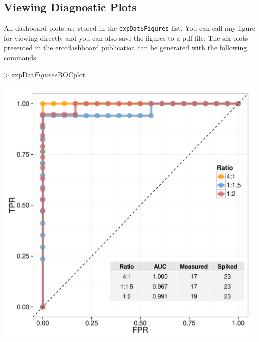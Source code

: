\documentclass{article}
\begin{document}
\subsection{Viewing Diagnostic Plots}
All dashboard plots are stored in the \verb|expDat$Figures|
list. You can call any figure for viewing directly and you can 
also save the figures to a pdf file. The six plots presented in the 
erccdashboard publication can be generated with the following commands.
\begin{center}
\begin{Schunk}
\begin{Sinput}
> expDat$Figures$ROCplot
\end{Sinput}
\end{Schunk}
\includegraphics{erccdashboardVignette-printPanelASEQC}
\end{center}
\clearpage
\end{document}
